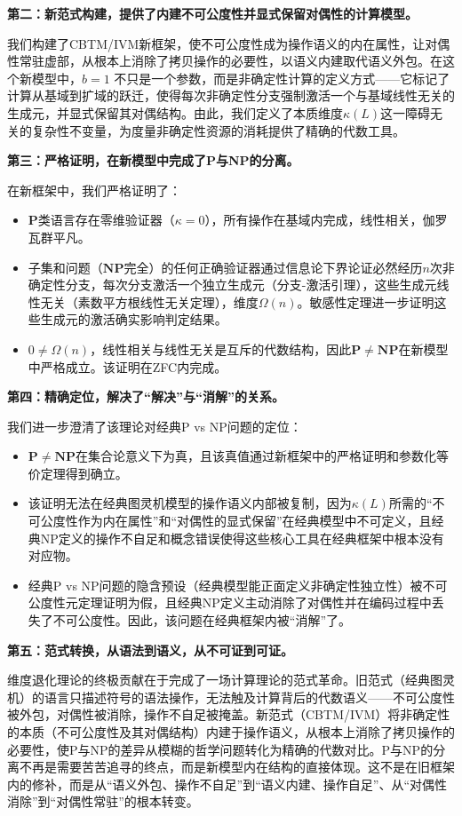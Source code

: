 \documentclass{ctexart}
\begin{document}
	\textbf{第二：新范式构建，提供了内建不可公度性并显式保留对偶性的计算模型。}
	
	我们构建了CBTM/IVM新框架，使不可公度性成为操作语义的内在属性，让对偶性常驻虚部，从根本上消除了拷贝操作的必要性，以语义内建取代语义外包。在这个新模型中，$b=1$ 不只是一个参数，而是非确定性计算的定义方式——它标记了计算从基域到扩域的跃迁，使得每次非确定性分支强制激活一个与基域线性无关的生成元，并显式保留其对偶结构。由此，我们定义了本质维度$\kappa(L)$这一障碍无关的复杂性不变量，为度量非确定性资源的消耗提供了精确的代数工具。
	
	\textbf{第三：严格证明，在新模型中完成了P与NP的分离。}
	
	在新框架中，我们严格证明了：
	\begin{itemize}
		\item $\mathbf{P}$类语言存在零维验证器（$\kappa=0$），所有操作在基域内完成，线性相关，伽罗瓦群平凡。
		\item 子集和问题（$\mathbf{NP}$完全）的任何正确验证器通过信息论下界论证必然经历$n$次非确定性分支，每次分支激活一个独立生成元（分支-激活引理），这些生成元线性无关（素数平方根线性无关定理），维度$\Omega(n)$。敏感性定理进一步证明这些生成元的激活确实影响判定结果。
		\item $0 \neq \Omega(n)$，线性相关与线性无关是互斥的代数结构，因此$\mathbf{P} \neq \mathbf{NP}$在新模型中严格成立。该证明在ZFC内完成。
	\end{itemize}
	
	\textbf{第四：精确定位，解决了``解决''与``消解''的关系。}
	
	我们进一步澄清了该理论对经典P vs NP问题的定位：
	\begin{itemize}
		\item $\mathbf{P}\neq\mathbf{NP}$在集合论意义下为真，且该真值通过新框架中的严格证明和参数化等价定理得到确立。
		\item 该证明无法在经典图灵机模型的操作语义内部被复制，因为$\kappa(L)$所需的``不可公度性作为内在属性''和``对偶性的显式保留''在经典模型中不可定义，且经典NP定义的操作不自足和概念错误使得这些核心工具在经典框架中根本没有对应物。
		\item 经典P vs NP问题的隐含预设（经典模型能正面定义非确定性独立性）被不可公度性元定理证明为假，且经典NP定义主动消除了对偶性并在编码过程中丢失了不可公度性。因此，该问题在经典框架内被``消解''了。
	\end{itemize}
	
	\textbf{第五：范式转换，从语法到语义，从不可证到可证。}
	
	维度退化理论的终极贡献在于完成了一场计算理论的范式革命。旧范式（经典图灵机）的语言只描述符号的语法操作，无法触及计算背后的代数语义——不可公度性被外包，对偶性被消除，操作不自足被掩盖。新范式（CBTM/IVM）将非确定性的本质（不可公度性及其对偶结构）内建于操作语义，从根本上消除了拷贝操作的必要性，使P与NP的差异从模糊的哲学问题转化为精确的代数对比。P与NP的分离不再是需要苦苦追寻的终点，而是新模型内在结构的直接体现。这不是在旧框架内的修补，而是从``语义外包、操作不自足''到``语义内建、操作自足''、从``对偶性消除''到``对偶性常驻''的根本转变。
	
\end{document}
